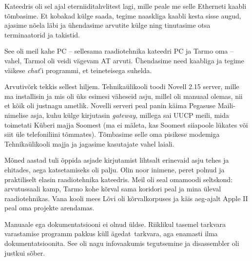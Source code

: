 Kateedris oli sel ajal eterniiditahvlitest lagi, mille peale me selle Etherneti kaabli tõmbasime. Et kobakad külge saada, tegime
naaskliga kaabli kesta sisse augud, ajasime nõela läbi ja ühendasime
arvutite külge ning tinutasime otsa terminaatorid ja takistid. 


See oli meil kahe PC -- sellesama raadiotehnika kateedri PC ja Tarmo oma -- vahel, Tarmol oli 
veidi vägevam AT arvuti. Ühendasime need 
kaabliga ja tegime väikese 
\emph{chat}'i programmi, et teineteisega suhelda. 

Arvutivõrk tekkis sellest hiljem. Tehnikaülikooli toodi Novell 2.15 
server, mille ma installisin ja mis oli üks esimesi väheseid asju, millel oli manuaal 
olemas, nii et kõik oli justnagu ametlik. Novelli serveri peal panin käima Pegasuse 
Maili-nimelise asja, kuhu külge kirjutasin \emph{gateway}, 
millega sai UUCP meili, mida toimetati Küberi 
majja Soomest (ma ei mäleta, kas Soomest siiapoole lükates või siit 
üle telefoniliini tõmmates). Tõmbasime selle oma pisikese modemiga 
Tehnikaülikooli majja ja jagasime kasutajate vahel laiali.


Mõned aastad tuli õppida asjade kirjutamist lihtsalt erinevaid asju tehes ja ehitades, aega katsetamiseks oli palju. 
Olin noor inimene, peret polnud ja praktiliselt elasin raadiotehnika 
kateedris. Meil oli seal omamoodi seltskond: arvutussaali 
kamp, Tarmo kohe kõrval sama 
koridori peal ja mina üleval raadiotehnikas. Vana kooli mees 
Lõvi oli kõrvalkorpuses ja käis aeg-ajalt Apple II peal 
oma projekte arendamas.


Manuaale ega dokumentatsiooni ei olnud üldse. Riiklikul 
tasemel tarkvara varastamise programm pakkus küll ägedat tarkvara, aga 
enamasti ilma dokumentatsioonita. See oli nagu infovaakumis 
tegutsemine ja disassembler oli justkui sõber.

